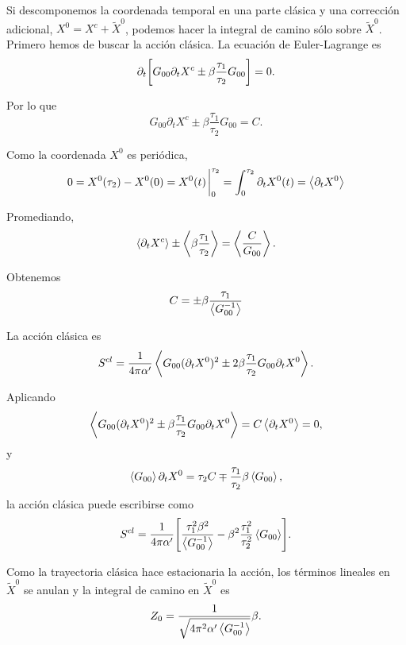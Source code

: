 Si descomponemos la coordenada temporal en una parte clásica y una corrección adicional,
$X^0=X^{c}+\tilde X^0$, podemos hacer la integral de camino sólo sobre $\tilde X^0$. 
Primero hemos de buscar la acción clásica.
La ecuación de Euler-Lagrange es 
\begin{equation}
  \partial_t\qty[G_{00}\partial_t X^c \pm \beta \frac{\tau_1}{\tau_2}G_{00}]=0.
\end{equation}

Por lo que 
\begin{equation}
  G_{00}\partial_t X^c \pm \beta \frac{\tau_1}{\tau_2}G_{00}=C.
\end{equation}

Como la coordenada $X^0$ es periódica,
\begin{equation}
  0=X^0(\tau_2) -X^0(0) = X^0(t)\eval_0^{\tau_2}= \int_0^{\tau_2}\partial_t X^0(t) = \ev{\partial_t X^0} 
\end{equation}

Promediando,
\begin{equation}
  \ev{\partial_t X^c} \pm \ev{\beta \frac{\tau_1}{\tau_2}}=\ev{\frac{C}{G_{00}}} .
\end{equation}

Obtenemos
\begin{equation}
  C = \pm \beta \frac{\tau_1}{\ev{G_{00}^{-1}}}
\end{equation}

La acción clásica es
\begin{equation}
  S^{cl}=\frac{1}{4\pi\alpha'}\ev{G_{00}(\partial_t X^0)^2 \pm 2\beta \frac{\tau_1}{\tau_2}G_{00}\partial_t X^0}.
\end{equation}

Aplicando 
\begin{equation}
  \ev{G_{00}(\partial_t X^0)^2 \pm \beta \frac{\tau_1}{\tau_2}G_{00}\partial_t X^0} = C\ev{\partial_t X^0} = 0,
\end{equation}
y
\begin{equation}
  \ev{G_{00}}\partial_t X^0 = \tau_2 C\mp \frac{\tau_1}{\tau_2}\beta \ev{G_{00}},
\end{equation}
la acción clásica puede escribirse como
\begin{equation}
  S^{cl}= \frac{1}{4\pi\alpha'} \qty[\frac{\tau_1^2\beta^2}{\ev{G_{00}^{-1}}}-\beta^2\frac{\tau_1^2}{\tau_2^2}\ev{G_{00}}].
\end{equation}

Como la trayectoria clásica hace estacionaria la acción, los términos lineales en $\tilde X^0$
se anulan y la integral de camino en $\tilde X^0$ es
\begin{equation}
  Z_0=\frac{1}{\sqrt{4\pi^2\alpha'\ev{G_{00}^{-1}}}}\beta.
\end{equation}

